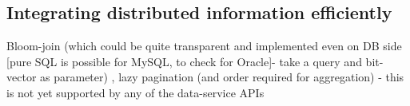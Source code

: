 \subsection{Integrating distributed information efficiently}
Bloom-join (which could be quite transparent and implemented even on DB side [pure SQL is possible for MySQL, to check for Oracle]- take a query and bit-vector as parameter) , lazy pagination (and order required for aggregation) - this is not yet supported by any of the data-service APIs


